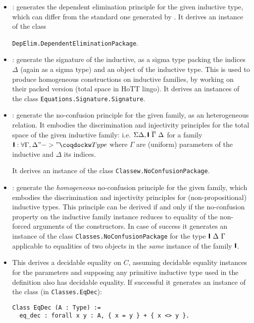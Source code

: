 \begin{itemize}
\item {}: generates the dependent
  elimination principle for the given inductive type, which can differ
  from the standard one generated by \Coq.
  It derives an instance of the class

  \texttt{DepElim.DependentEliminationPackage}.
\item {}: generate the signature of the inductive, as a
  sigma type packing the indices $\Delta$ (again as a sigma type) and
  an object of the inductive type. This is used to produce homogeneous
  constructions on inductive families, by working on their packed
  version (total space in HoTT lingo).
  It derives an instances of the class
  \texttt{Equations.Signature.Signature}.

\item {}: generate the no-confusion principle for the
  given family, as an heterogeneous relation. It embodies the
  discrimination and injectivity principles for the
  total space of the given inductive family: i.e.
  $\Sigma \Delta, \textbf{\mbox{\textsf{I}}}~{\overline \Gamma}~\Delta$ for a family
  $\ind{I} : \forall \Gamma, \Delta "->" \kw{Type}$ where $\Gamma$ are
  (uniform) parameters of the inductive and $\Delta$ its indices.

  It derives an instance of the class \texttt{Classew.NoConfusionPackage}.

\item {}: generate the \emph{homogeneous} no-confusion
  principle for the given family, which embodies the discrimination and
  injectivity principles for (non-propositional) inductive types.
  This principle can be derived if and only if the no-confusion property
  on the inductive family instance reduces to equality of the non-forced
  arguments of the constructors. In case of success it generates an instance of the class
  \texttt{Classes.NoConfusionPackage} for the type $\textbf{\mbox{\textsf{I}}}~
  \Delta~\Gamma$ applicable to equalities of two objects in the \emph{same}
  instance of the family $\textbf{\mbox{\textsf{I}}}$.

\item {}
  This derives a decidable equality on $C$, assuming decidable equality 
  instances for the parameters and supposing any primitive inductive
  type used in the definition also has decidable equality. If
  successful it generates an instance of the class (in \texttt{Classes.EqDec}):
\begin{verbatim}
Class EqDec (A : Type) :=
  eq_dec : forall x y : A, { x = y } + { x <> y }.
\end{verbatim}
  

\end{itemize}
